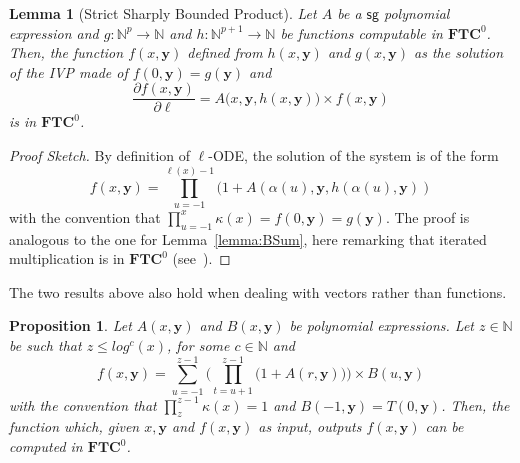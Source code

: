 \documentclass[11pt, oneside]{article}
\newenvironment{toappendix}{}{}
\newcommand{\fun}[1]{\mathsf{#1}}
\newcommand{\sB}{B}
\newcommand{\sA}{A}
\newcommand{\Nat}{\mathbb{N}}
\newcommand{\TC}{\mathbf{FTC}}
\newcommand{\tu}[1]{\mathbf{#1}}
\newtheorem{prop}{Proposition}
\newtheorem{lemma}{Lemma}
\theoremstyle{definition}
\newtheorem{defn}{Definition}
\newcommand{\pODE}{\ell\text{-pODE}}
\begin{document}
\begin{toappendix}
\begin{lemma}[Strict Sharply Bounded Product]\label{lemma:BProd}
    Let $\sA$ be a $\fun{sg}$ polynomial expression and $g:\Nat^{p}\to \Nat$ and $h:\Nat^{p+1}\to \Nat$ be functions computable in $\TC^0$.
    Then, the function $f(x, \tu y)$ defined from $h(x, \tu y)$ and $g(x, \tu y)$ as the solution of the IVP made of $f(0, \tu y)=g(\tu y)$ and
    $$
        \frac{\partial f(x, \tu y)}{\partial \ell} = \sA\big(x, \tu y, h(x, \tu y)\big)\times f(x, \tu y)
    $$
    is in $\TC^0$.
\end{lemma}
\begin{proof}[Proof Sketch]
    By definition of $\ell$-ODE, the solution of the system is of the form 
    $$
    f(x, \tu y) =\prod^{\ell(x)-1}_{u=-1} (1 + \sA(\alpha(u), \tu y, h(\alpha(u), \tu y))
    $$
    with the convention that $\prod^{x}_{u=-1}\kappa(x)=f(0, \tu y)=g(\tu y)$.
    The proof is analogous to the one for Lemma~\ref{lemma:BSum}, here remarking that iterated multiplication is in $\TC^0$ (see~\cite{HAB}).
\end{proof}



\noindent 
The two results above also hold when dealing with vectors rather than functions.

\begin{prop}\label{prop:aux}
    Let $\sA(x, \tu y)$ and $\sB(x, \tu y)$ be polynomial expressions.
    Let $z\in \Nat$ be such that $z\leq log^c(x)$, for some $c\in \Nat$ and 
    $$
        f(x, \tu y) = \sum^{z-1}_{u=-1} \Bigg(\prod^{z-1}_{t=u+1} \bigg(1+\sA(r, \tu y)\bigg)\Bigg) \times \sB (u, \tu y)
    $$
    with the convention that $\prod^{z-1}_z \kappa(x)=1$ and $\sB(-1, \tu y)=T(0, \tu y)$.
    Then, the function which, given $x, \tu y$ and $f(x, \tu y)$ as input, outputs $f(x, \tu y)$ can be computed in $\TC^0$.
\end{prop}


%



\end{toappendix}
\end{document}
